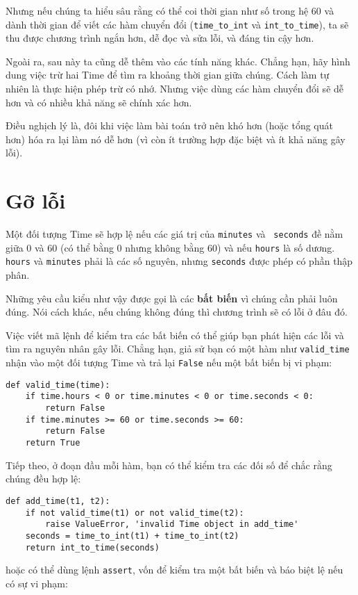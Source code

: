 \documentclass[11pt]{book}
\begin{document}
Nhưng nếu chúng ta hiểu sâu rằng có thể coi thời gian như số trong hệ 60
và dành thời gian để viết các hàm chuyển đổi (\verb"time_to_int"
và \verb"int_to_time"), ta sẽ thu được chương trình ngắn hơn, dễ đọc và
sửa lỗi, và đáng tin cậy hơn.

Ngoài ra, sau này ta cũng dễ thêm vào các tính năng khác. Chẳng hạn,
hãy hình dung việc trừ hai Time để tìm ra khoảng thời gian giữa chúng.
Cách làm tự nhiên là thực hiện phép trừ có nhớ. Nhưng việc dùng các
hàm chuyển đổi sẽ dễ hơn và có nhiều khả năng sẽ chính xác hơn.


Điều nghịch lý là, đôi khi việc làm bài toán trở nên khó hơn (hoặc tổng 
quát hơn) hóa ra lại làm nó dễ hơn  (vì còn ít trường hợp đặc biệt và
ít khả năng gây lỗi).


\section{Gỡ lỗi}

Một đối tượng Time sẽ hợp lệ nếu các giá trị của {\tt minutes} và {\tt
seconds} đề nằm giữa 0 và 60 (có thể bằng 0 nhưng không bằng 60) và
nếu {\tt hours} là số dương.  {\tt hours} và {\tt minutes} phải là các số
nguyên, nhưng {\tt seconds} được phép có phần thập phân.


Những yêu cầu kiểu như vậy được gọi là các {\bf bất biến} vì chúng
cần phải luôn đúng. Nói cách khác, nếu chúng không đúng thì chương
trình sẽ có lỗi ở đâu đó.

Việc viết mã lệnh để kiểm tra các bất biến có thể giúp bạn phát hiện
các lỗi và tìm ra nguyên nhân gây lỗi. Chẳng hạn, giả sử bạn có một hàm
như \verb"valid_time" nhận vào một đối tượng Time và trả lại 
{\tt False} nếu một bất biến bị vi phạm:

\beforeverb
\begin{verbatim}
def valid_time(time):
    if time.hours < 0 or time.minutes < 0 or time.seconds < 0:
        return False
    if time.minutes >= 60 or time.seconds >= 60:
        return False
    return True
\end{verbatim}
\afterverb
%

Tiếp theo, ở đoạn đầu mỗi hàm, bạn có thể kiểm tra các đối số
để chắc rằng chúng đều hợp lệ:


\beforeverb
\begin{verbatim}
def add_time(t1, t2):
    if not valid_time(t1) or not valid_time(t2):
        raise ValueError, 'invalid Time object in add_time'
    seconds = time_to_int(t1) + time_to_int(t2)
    return int_to_time(seconds)
\end{verbatim}
\afterverb
%
hoặc có thể dùng lệnh {\tt assert}, vốn để kiểm tra một bất biến và
báo biệt lệ nếu có sự vi phạm:
\end{document}
